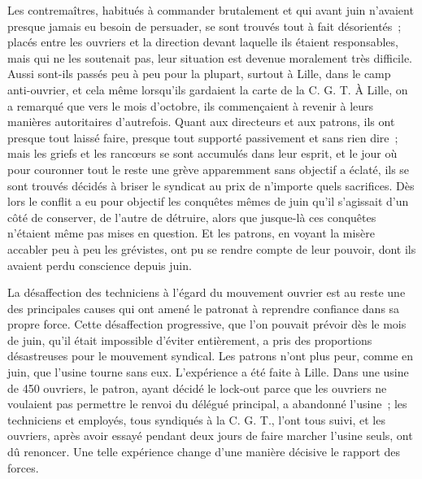 \documentclass[french,twoside]{book} %
\begin{document}
Les contremaîtres, habitués à commander brutalement et qui avant juin n'avaient presque jamais eu besoin de persuader, se sont trouvés tout à fait désorientés ; placés entre les ouvriers et la direction devant laquelle ils étaient responsables, mais qui ne les soutenait pas, leur situation est devenue moralement très difficile. Aussi sont-ils passés peu à peu pour la plupart, surtout à Lille, dans le camp anti-ouvrier, et cela même lorsqu'ils gardaient la carte de la C. G. T. À Lille, on a remarqué que vers le mois d'octobre, ils commençaient à revenir à leurs manières autoritaires d'autrefois. Quant aux directeurs et aux patrons, ils ont presque tout laissé faire, presque tout supporté passivement et sans rien dire ; mais les griefs et les rancœurs se sont accumulés dans leur esprit, et le jour où pour couronner tout le reste une grève apparemment sans objectif a éclaté, ils se sont trouvés décidés à briser le syndicat au prix de n'importe quels sacrifices. Dès lors le conflit a eu pour objectif les conquêtes mêmes de juin qu'il s'agissait d'un côté de conserver, de l'autre de détruire, alors que jusque-là ces conquêtes n'étaient même pas mises en question. Et les patrons, en voyant la misère accabler peu à peu les grévistes, ont pu se rendre compte de leur pouvoir, dont ils avaient perdu conscience depuis juin.\par
La désaffection des techniciens à l'égard du mouvement ouvrier est au reste une des principales causes qui ont amené le patronat à reprendre confiance dans sa propre force. Cette désaffection progressive, que l'on pouvait prévoir dès le mois de juin, qu'il était impossible d'éviter entièrement, a pris des proportions désastreuses pour le mouvement syndical. Les patrons n'ont plus peur, comme en juin, que l'usine tourne sans eux. L'expérience a été faite à Lille. Dans une usine de 450 ouvriers, le patron, ayant décidé le lock-out parce que les ouvriers ne voulaient pas permettre le renvoi du délégué principal, a abandonné l'usine ; les techniciens et employés, tous syndiqués à la C. G. T., l'ont tous suivi, et les ouvriers, après avoir essayé pendant deux jours de faire marcher l'usine seuls, ont dû renoncer. Une telle expérience change d'une manière décisive le rapport des forces.
\end{document}
